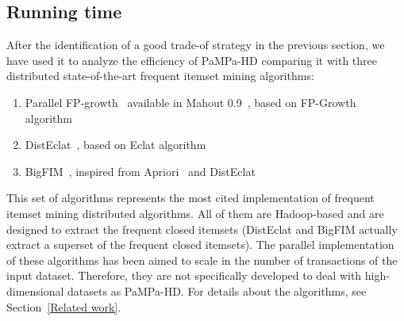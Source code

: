 %
%
%
%


\subsection{Running time}\label{running_time}
After the identification of a good trade-of strategy in the previous section, we have used it to analyze the efficiency of PaMPa-HD
comparing it with three distributed state-of-the-art frequent itemset mining algorithms:
\begin{enumerate}
\item Parallel FP-growth~\cite{pfpgrowth} available in Mahout 0.9~\cite{Mahout}, based on FP-Growth algorithm~\cite{Han00}

\item DistEclat~\cite{bigfim}, based on Eclat algorithm~\cite{Zaki97newalgorithms}
\item BigFIM~\cite{bigfim}, inspired from Apriori~\cite{Agr94} and DistEclat
\end{enumerate}
This set of algorithms represents the most cited implementation of frequent itemset mining distributed algorithms. All of them are Hadoop-based and are designed to extract the frequent closed itemsets (DistEclat and BigFIM actually extract a superset of the frequent closed itemsets).
The parallel implementation of these algorithms has been aimed to scale in the number of transactions of the input dataset. Therefore, they are not specifically developed to deal with
high-dimensional datasets as PaMPa-HD. 
For details about the algorithms, see Section~\ref{Related work}.

